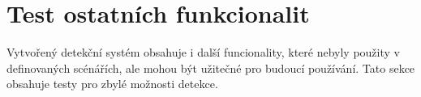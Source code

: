 
\section{Test ostatních funkcionalit}
Vytvořený detekční systém obsahuje i další funcionality, které nebyly použity v definovaných scénářích,
ale mohou být užitečné pro budoucí používání. Tato sekce obsahuje testy pro zbylé možnosti
detekce.

